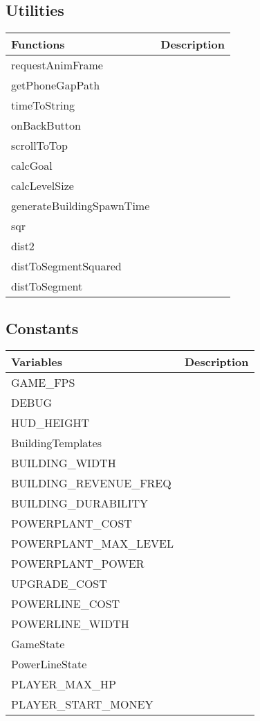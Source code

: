 \subsection*{Utilities}

	\begin{table}[H]
	\begin{tabular}{p{6cm} | p{6cm} }
	\hline
	\rowcolor{gray}
	Functions & Description \\ \hline
	requestAnimFrame & \\ \hline
	getPhoneGapPath & \\ \hline
	timeToString & \\ \hline
	onBackButton & \\ \hline
	scrollToTop & \\ \hline
	calcGoal & \\ \hline
	calcLevelSize & \\ \hline
	generateBuildingSpawnTime & \\ \hline
	sqr & \\ \hline
	dist2 & \\ \hline
	distToSegmentSquared & \\ \hline
	distToSegment & \\ \hline

	\end{tabular}
	\end{table}

\clearpage

\subsection*{Constants}

	\begin{table}[H]
	\begin{tabular}{p{6cm} | p{6cm} }

	\hline
	\rowcolor{gray}
	Variables & Description \\ \hline
	GAME\_FPS & \\ \hline
	DEBUG & \\ \hline
	HUD\_HEIGHT & \\ \hline
	BuildingTemplates & \\ \hline
	BUILDING\_WIDTH & \\ \hline
	BUILDING\_REVENUE\_FREQ & \\ \hline
	BUILDING\_DURABILITY & \\ \hline
	POWERPLANT\_COST & \\ \hline
	POWERPLANT\_MAX\_LEVEL & \\ \hline
	POWERPLANT\_POWER & \\ \hline
	UPGRADE\_COST & \\ \hline
	POWERLINE\_COST & \\ \hline
	POWERLINE\_WIDTH & \\ \hline
	GameState & \\ \hline
	PowerLineState & \\ \hline
	PLAYER\_MAX\_HP & \\ \hline
	PLAYER\_START\_MONEY & \\ \hline

	\end{tabular}
	\end{table}
